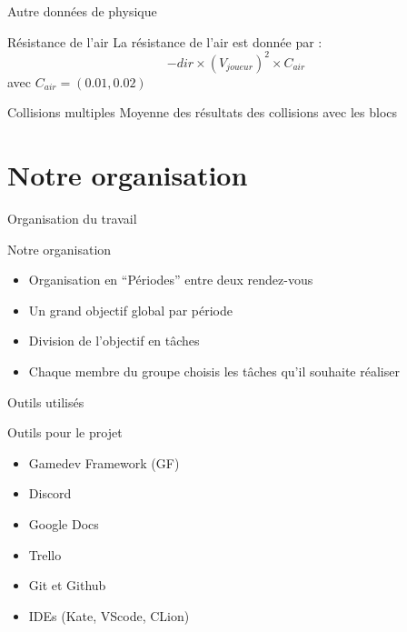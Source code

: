 \documentclass{beamer}
\begin{document}
{\begin{frame}{Autre données de physique}
    \begin{block}{Résistance de l'air}
        La résistance de l'air est donnée par :
        \[
         -dir \times (V_{joueur})^2 \times C_{air}
        \]
        avec \(C_{air} = (0.01,0.02)\)
    \end{block}

    \begin{block}{Collisions multiples}
        Moyenne des résultats des collisions avec les blocs
    \end{block}
\end{frame}

\section{Notre organisation}
\begin{frame}{Organisation du travail}
    \begin{block}{Notre organisation}
        \begin{itemize}
            \item[\bullet] Organisation en ``Périodes'' entre deux rendez-vous
            \item[\bullet] Un grand objectif global par période
            \item[\bullet] Division de l'objectif en tâches
            \item[\bullet] Chaque membre du groupe choisis les tâches qu'il souhaite réaliser
        \end{itemize}
    \end{block}
\end{frame}

\begin{frame}{Outils utilisés}
    \begin{block}{Outils pour le projet}
        \begin{itemize}
            \item[\bullet] Gamedev Framework (GF)
            \item[\bullet] Discord
            \item[\bullet] Google Docs
            \item[\bullet] Trello
            \item[\bullet] Git et Github
            \item[\bullet] IDEs (Kate, VScode, CLion)
        \end{itemize}
    \end{block}
\end{frame}

}
\end{document}
